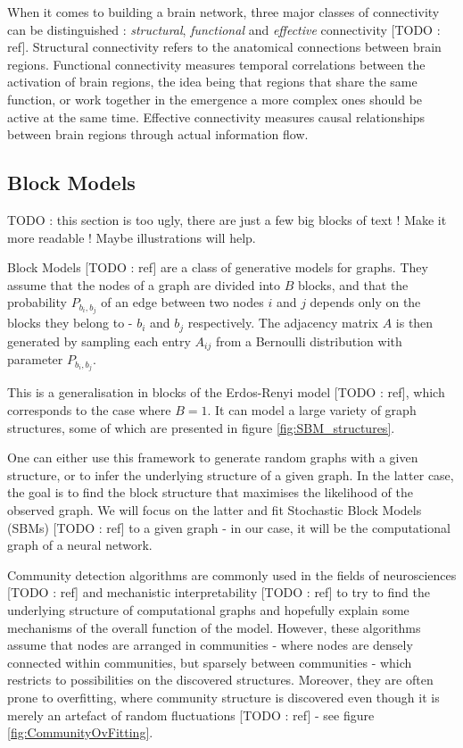 \documentclass{article}
\begin{document}
When it comes to building a brain network, three major classes of connectivity can be distinguished : \textit{structural}, \textit{functional} and \textit{effective} connectivity [TODO : ref]. Structural connectivity refers to the anatomical connections between brain regions. Functional connectivity measures temporal correlations between the activation of brain regions, the idea being that regions that share the same function, or work together in the emergence a more complex ones should be active at the same time. Effective connectivity measures causal relationships between brain regions through actual information flow.

\subsection{Block Models}
\label{sec:SBM}

TODO : this section is too ugly, there are just a few big blocks of text ! Make it more readable ! Maybe illustrations will help.


Block Models [TODO : ref] are a class of generative models for graphs. They assume that the nodes of a graph are divided into $B$ blocks, and that the probability $P_{b_i, b_j}$ of an edge between two nodes $i$ and $j$ depends only on the blocks they belong to - $b_i$ and $b_j$ respectively. The adjacency matrix $A$ is then generated by sampling each entry $A_{ij}$ from a Bernoulli distribution with parameter $P_{b_i, b_j}$.

This is a generalisation in blocks of the Erdos-Renyi model [TODO : ref], which corresponds to the case where $B = 1$. It can model a large variety of graph structures, some of which are presented in figure \ref{fig:SBM_structures}.

One can either use this framework to generate random graphs with a given structure, or to infer the underlying structure of a given graph. In the latter case, the goal is to find the block structure that maximises the likelihood of the observed graph. We will focus on the latter and fit Stochastic Block Models (SBMs) [TODO : ref] to a given graph - in our case, it will be the computational graph of a neural network.

Community detection algorithms are commonly used in the fields of neurosciences [TODO : ref] and mechanistic interpretability [TODO : ref] to try to find the underlying structure of computational graphs and hopefully explain some mechanisms of the overall function of the model. However, these algorithms assume that nodes are arranged in communities - where nodes are densely connected within communities, but sparsely between communities - which restricts to possibilities on the discovered structures. Moreover, they are often prone to overfitting, where community structure is discovered even though it is merely an artefact of random fluctuations [TODO : ref] - see figure \ref{fig:CommunityOvFitting}.
\end{document}

